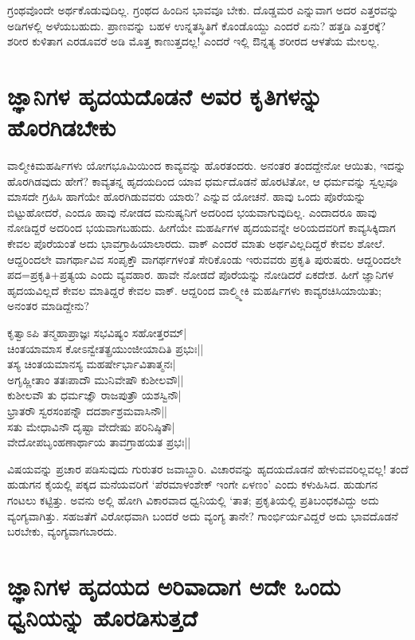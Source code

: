 ಗ್ರಂಥವೊಂದೇ ಅರ್ಥಕೊಡುವುದಿಲ್ಲ. ಗ್ರಂಥದ ಹಿಂದಿನ ಭಾವವೂ ಬೇಕು. ದೊಡ್ಡಮರ ಎನ್ನುವಾಗ ಅದರ ಎತ್ತರವನ್ನು ಅಡಿಗಳಲ್ಲಿ ಅಳೆಯಬಹುದು. ಪ್ರಾಣವನ್ನು ಬಹಳ ಉನ್ನತಸ್ಥಿತಿಗೆ ಕೊಂಡೊಯ್ದು ಎಂದರೆ ಏನು? ಹತ್ತಡಿ ಎತ್ತರಕ್ಕೆ? ಶರೀರ ಕುಳಿತಾಗ ಎರಡೂವರೆ ಅಡಿ ಮೊತ್ತ ಕಾಣುತ್ತದಲ್ಲ! ಎಂದರೆ ಇಲ್ಲಿ ಔನ್ನತ್ಯ ಶರೀರದ ಆಳತೆಯ ಮೇಲಲ್ಲ. 

\section*{ಜ್ಞಾನಿಗಳ ಹೃದಯದೊಡನೆ ಅವರ ಕೃತಿಗಳನ್ನು ಹೊರಗಿಡಬೇಕು}

ವಾಲ್ಮೀಕಿಮಹರ್ಷಿಗಳು ಯೋಗಭೂಮಿಯಿಂದ ಕಾವ್ಯವನ್ನು ಹೊರತಂದರು. ಅನಂತರ ತಂದದ್ದೇನೋ ಆಯಿತು, ಇದನ್ನು ಹೊರಗಿಡವುದು ಹೇಗೆ? ಕಾವ್ಯತನ್ನ ಹೃದಯದಿಂದ ಯಾವ ಧರ್ಮದೊಡನೆ ಹೊರಟಿತೋ, ಆ ಧರ್ಮವನ್ನು ಸ್ವಲ್ಪವೂ ಮಾಸದೇ ಗ್ರಹಿಸಿ ಹಾಗೆಯೇ ಹೊರಗಿಡುವವರು ಯಾರು? ಎನ್ನುವ ಯೋಚನೆ. ಹಾವು ಒಂದು ಪೊರೆಯನ್ನು ಬಿಟ್ಟುಹೋದರೆ, ಎಂದೂ ಹಾವು ನೋಡದ ಮನುಷ್ಯನಿಗೆ ಅದರಿಂದ ಭಯವಾಗುವುದಿಲ್ಲ. ಎಂದಾದರೂ ಹಾವು ನೋಡಿದ್ದರೆ ಅದರಿಂದ ಭಯವಾಗಬಹುದು. ಹೀಗೆಯೇ ಮಹರ್ಷಿಗಳ ಹೃದಯವನ್ನೇ ಅರಿಯದವರಿಗೆ ಕಾವ್ಯಸಿಕ್ಕಿದಾಗ ಕೇವಲ ಪೊರೆಯಂತೆ ಅದು ಭಾವಗ್ರಾಹಿಯಾಲಾರದು. ವಾಕ್ ಎಂದರೆ ಮಾತು ಅರ್ಥವಿಲ್ಲದಿದ್ದರೆ ಕೇವಲ ಶೋಲೆ. ಆದ್ದರಿಂದಲೇ ವಾಗರ್ಥಾವಿವ ಸಂಪೃಕ್ತೌ ವಾಗರ್ಥಗಳಂತೆ\label{238} ಸೇರಿಕೊಂಡು ಇರುವವರು ಪ್ರಕೃತಿ ಪುರುಷರು. ಆದ್ದರಿಂದಲೇ ಪದ=ಪ್ರಕೃತಿ+ಪ್ರತ್ಯಯ ಎಂದು ವ್ಯವಹಾರ. ಹಾವೇ ನೋಡದೆ ಪೊರೆಯನ್ನು ನೋಡಿದರೆ ಏಕದೇಶ. ಹೀಗೆ ಜ್ಞಾನಿಗಳ ಹೃದಯವಿಲ್ಲದೆ ಕೇವಲ ಮಾತಿದ್ದರೆ ಕೇವಲ ವಾಕ್. ಆದ್ದರಿಂದ ವಾಲ್ಮ್ಮೀಕಿ ಮಹರ್ಷಿಗಳು ಕಾವ್ಯರಚಿಸಿಯಾಯಿತು; ಅನಂತರ ಮಾಡಿದ್ದೇನು? 

\begin{shloka}
ಕೃತ್ವಾಽಪಿ ತನ್ಮಹಾಪ್ರಾಜ್ಞಃ ಸಭವಿಷ್ಯಂ ಸಹೋತ್ತರಮ್|\label{238a}\\
ಚಿಂತಯಾಮಾಸ ಕೋಽನ್ವೇತತ್ಪ್ರಯುಂಜೀಯಾದಿತಿ ಪ್ರಭುಃ||\\
ತಸ್ಯ ಚಿಂತಯಮಾನಸ್ಯ ಮಹರ್ಷೇರ್ಭಾವಿತಾತ್ಮನಃ|\label{238c}\\
ಅಗೃಹ್ಣೀತಾಂ ತತಃಪಾದೌ ಮುನಿವೇಷೌ ಕುಶೀಲವೌ||\\
ಕುಶೀಲವೌ ತು ಧರ್ಮಜ್ಞೌ ರಾಜಪುತ್ರೌ ಯಶಸ್ವಿನೌ|\label{238b}\\
ಭ್ರಾತರೌ ಸ್ವರಸಂಪನ್ನೌ ದದರ್ಶಾಶ್ರಮವಾಸಿನೌ||\\
ಸತು ಮೇಧಾವಿನೌ ದೃಷ್ಟಾ ವೇದೇಷು ಪರಿನಿಷ್ಠಿತೌ|\label{239}\\
ವೇದೋಪಬೃಂಹಣಾರ್ಥಾಯ ತಾವಗ್ರಾಹಯತ ಪ್ರಭಃ||
\end{shloka}

ವಿಷಯವನ್ನು ಪ್ರಚಾರ ಪಡಿಸುವುದು ಗುರುತರ ಜವಾಬ್ದಾರಿ. ವಿಚಾರವನ್ನು ಹೃದಯದೊಡನೆ ಹೇಳುವವರಿಲ್ಲವಲ್ಲ! ತಂದೆ ಹುಡುಗನ ಕೈಯಲ್ಲಿ ಪಕ್ಕದ ಮನೆಯವರಿಗೆ `ಪೆರಮಾಳಂಶೇಕ್ ಇಂಗೇ ಏಳಣಂ' ಎಂದು ಕಳುಹಿಸಿದ. ಹುಡುಗನ ಗಂಟಲು ಕಟ್ಟಿತ್ತು. ಅವನು ಅಲ್ಲಿ ಹೋಗಿ ವಿಕಾರವಾದ ಧ್ವನಿಯಲ್ಲಿ `ತಾತ; ಪ್ರಕೃತಿಯಲ್ಲಿ ಪ್ರತಿಬಂಧಕವಿದ್ದು ಅದು ವ್ಯಂಗ್ಯವಾಗಿತ್ತು. ಸಹಜತೆಗೆ ವಿರೋಧವಾಗಿ ಬಂದರೆ ಅದು ವ್ಯಂಗ್ಯ ತಾನೇ? ಗಾಂರ್ಭಿರ್ಯವಿದ್ದರೆ ಅದು ಭಾವದೊಡನೆ ಬರಬೇಕು, ವ್ಯಂಗ್ಯವಾಗಬಾರದು.

\section*{ಜ್ಞಾನಿಗಳ ಹೃದಯದ ಅರಿವಾದಾಗ ಅದೇ ಒಂದು ಧ್ವನಿಯನ್ನು  ಹೊರಡಿಸುತ್ತದೆ}

